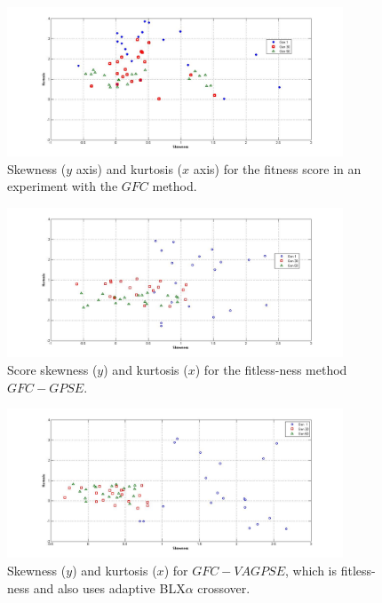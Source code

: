 \documentclass[10pt,journal,compsoc]{IEEEtran}
\begin{document}
\begin{figure}[!ht]	
	\begin{center}
		\includegraphics[width=10cm]{fig/gfc.jpg}
		\caption{Skewness ($y$ axis) and kurtosis ($x$ axis)
                  for the fitness score in an experiment with the
                  $GFC$ method.}
		\label{fig:gfcsk}	
	\end{center}	
\end{figure}
\begin{figure}[!ht]	
	\begin{center}
		\includegraphics[width=10cm]{fig/gfcrse.jpg}
		\caption{Score skewness ($y$) and kurtosis ($x$) for
                  the fitless-ness method $GFC-GPSE$.}
		\label{fig:gfcrsesk}	
	\end{center}	
\end{figure}
\begin{figure}[!ht]	
	\begin{center}
		\includegraphics[width=10cm]{fig/gfcvarse.jpg}
		\caption{Skewness ($y$) and kurtosis ($x$) for
                  $GFC-VAGPSE$, which is fitless-ness and also uses
                  adaptive BLX$\alpha$ crossover.}
		\label{fig:gfcvarsesk}	
	\end{center}	
\end{figure}
\end{document}

